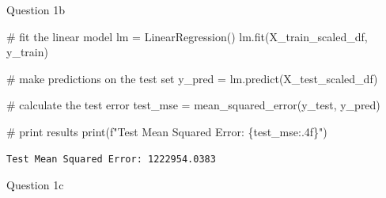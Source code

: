 \documentclass[
  letterpaper,
  DIV=11,
  numbers=noendperiod]{scrartcl}
\newenvironment{Shaded}{\begin{snugshade}}{\end{snugshade}}
\newcommand{\BuiltInTok}[1]{\textcolor[rgb]{0.00,0.23,0.31}{#1}}
\newcommand{\CommentTok}[1]{\textcolor[rgb]{0.37,0.37,0.37}{#1}}
\newcommand{\NormalTok}[1]{\textcolor[rgb]{0.00,0.23,0.31}{#1}}
\newcommand{\OperatorTok}[1]{\textcolor[rgb]{0.37,0.37,0.37}{#1}}
\newcommand{\SpecialCharTok}[1]{\textcolor[rgb]{0.37,0.37,0.37}{#1}}
\newcommand{\SpecialStringTok}[1]{\textcolor[rgb]{0.13,0.47,0.30}{#1}}
\begin{document}
Question 1b

\begin{Shaded}
\begin{Highlighting}[]
\CommentTok{\# fit the linear model}
\NormalTok{lm }\OperatorTok{=}\NormalTok{ LinearRegression()}
\NormalTok{lm.fit(X\_train\_scaled\_df, y\_train)}

\CommentTok{\# make predictions on the test set}
\NormalTok{y\_pred }\OperatorTok{=}\NormalTok{ lm.predict(X\_test\_scaled\_df)}

\CommentTok{\# calculate the test error}
\NormalTok{test\_mse }\OperatorTok{=}\NormalTok{ mean\_squared\_error(y\_test, y\_pred)}

\CommentTok{\# print results}
\BuiltInTok{print}\NormalTok{(}\SpecialStringTok{f"Test Mean Squared Error: }\SpecialCharTok{\{}\NormalTok{test\_mse}\SpecialCharTok{:.4f\}}\SpecialStringTok{"}\NormalTok{)}
\end{Highlighting}
\end{Shaded}

\begin{verbatim}
Test Mean Squared Error: 1222954.0383
\end{verbatim}

Question 1c
\end{document}
